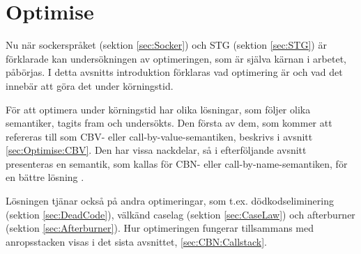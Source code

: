 \documentclass[Rapport]{subfiles}
\begin{document}
\chapter{Optimise}
\label{sec:Optimise}

\overviewOptimise

Nu när sockerspråket (sektion \ref{sec:Socker}) och STG (sektion \ref{sec:STG}) är förklarade
kan undersökningen av optimeringen, som är själva kärnan i arbetet, påbörjas.
I detta avsnitts introduktion förklaras vad optimering är och 
vad det innebär att göra det under körningstid. 

För att optimera under körningstid har olika lösningar, som följer olika semantiker, tagits fram och undersökts.   
Den första av dem, som kommer att refereras till som CBV- eller call-by-value-semantiken, 
beskrivs i avsnitt \ref{sec:Optimise:CBV}. Den har vissa nackdelar, så i 
efterföljande avsnitt presenteras en semantik, som kallas för CBN- eller call-by-name-semantiken, för en bättre lösning .

Lösningen tjänar också på andra optimeringar, som t.ex.
dödkodseliminering (sektion \ref{sec:DeadCode}), 
välkänd caselag (sektion \ref{sec:CaseLaw}) och 
afterburner (sektion \ref{sec:Afterburner}).
Hur optimeringen fungerar tillsammans med anropsstacken visas i det sista avsnittet, \ref{sec:CBN:Callstack}.


\end{document}
